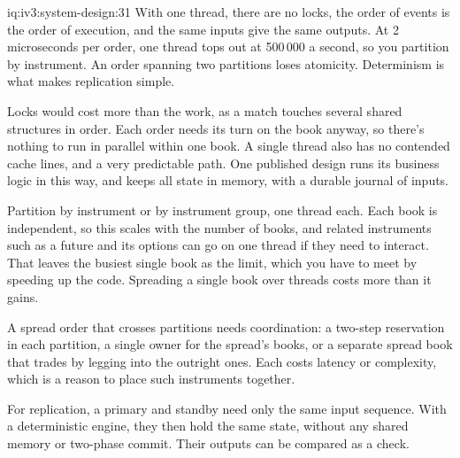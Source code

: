 \begin{solution}{iq:iv3:system-design:31}
With one thread, there are no locks, the order of events is the order of execution, and the same inputs give the same outputs. At 2 microseconds per order, one thread tops out at 500\,000 a second, so you partition by instrument. An order spanning two partitions loses atomicity. Determinism is what makes replication simple.

Locks would cost more than the work, as a match touches several shared structures in order. Each order needs its turn on the book anyway, so there's nothing to run in parallel within one book. A single thread also has no contended cache lines, and a very predictable path. One published design runs its business logic in this way, and keeps all state in memory, with a durable journal of inputs.

Partition by instrument or by instrument group, one thread each. Each book is independent, so this scales with the number of books, and related instruments such as a future and its options can go on one thread if they need to interact. That leaves the busiest single book as the limit, which you have to meet by speeding up the code. Spreading a single book over threads costs more than it gains.

A spread order that crosses partitions needs coordination: a two-step reservation in each partition, a single owner for the spread's books, or a separate spread book that trades by legging into the outright ones. Each costs latency or complexity, which is a reason to place such instruments together.

For replication, a primary and standby need only the same input sequence. With a deterministic engine, they then hold the same state, without any shared memory or two-phase commit. Their outputs can be compared as a check.

\end{solution}

